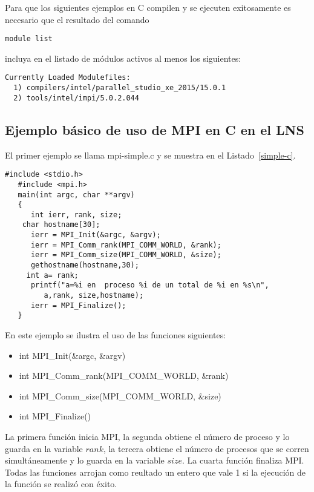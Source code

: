 \documentclass[letter]{jpconf}
\begin{document}
Para que los siguientes ejemplos en C compilen y se ejecuten exitosamente es necesario que el resultado del comando 
\color{blue}
\begin{verbatim}
module list
\end{verbatim}
\color{black}
incluya en el listado de m\'odulos activos al menos los siguientes:
\color{blue}
\begin{verbatim}
Currently Loaded Modulefiles:
  1) compilers/intel/parallel_studio_xe_2015/15.0.1   
  2) tools/intel/impi/5.0.2.044
\end{verbatim}
\color{black}




\subsection{\label{subseccionC}\textbf{Ejemplo b\'asico de uso de MPI en C en el LNS}}

El primer ejemplo se llama mpi-simple.c y se muestra en el Listado~\ref{simple-c}.
\begin{lstlisting}[float,floatplacement=H,label=simple-c,caption=Listado del programa  \texttt{mpi-simple.c} en C]
  #include <stdio.h>
   #include <mpi.h>
   main(int argc, char **argv)
   {
      int ierr, rank, size;
    char hostname[30]; 
      ierr = MPI_Init(&argc, &argv);
      ierr = MPI_Comm_rank(MPI_COMM_WORLD, &rank);
      ierr = MPI_Comm_size(MPI_COMM_WORLD, &size);
      gethostname(hostname,30);
     int a= rank;
      printf("a=%i en  proceso %i de un total de %i en %s\n", 
         a,rank, size,hostname);
      ierr = MPI_Finalize();
   }
  \end{lstlisting}

En este ejemplo se ilustra el uso de las funciones siguientes:
\begin{itemize} 
\item int MPI\_Init(\&argc, \&argv)
\item int MPI\_Comm\_rank(MPI\_COMM\_WORLD, \&rank)
\item int MPI\_Comm\_size(MPI\_COMM\_WORLD, \&size)
\item int MPI\_Finalize()
\end{itemize} 

La primera funci\'on inicia MPI, la segunda obtiene el n\'umero de proceso y lo guarda en la variable $rank$, la tercera obtiene el n\'umero de procesos que se corren simult\'aneamente y lo guarda en la variable $size$. La cuarta funci\'on finaliza MPI. Todas las funciones arrojan como reultado un entero que vale 1 si la ejecuci\'on de la funci\'on se realiz\'o con \'exito.
\end{document}
